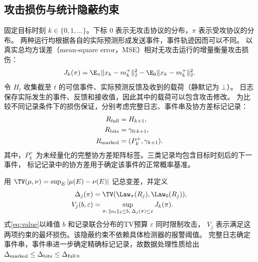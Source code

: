 \subsection{攻击损伤与统计隐蔽约束}
固定目标时刻 $k\in\{0,1,\ldots\}$。下标 $0$ 表示无攻击协议的分布，$\pi$ 表示受攻协议的分布。
两种运行均根据各自的实际预测形成发送事件，事件轨迹因而可以不同。
以真实总均方误差（mean-square error，MSE）相对无攻击运行的增量衡量攻击损伤：
\begin{equation}
 J_k(\pi)=\E_\pi\|x_k-m_k^+\|_2^2-
             \E_0\|x_k-m_k^+\|_2^2.
 \label{eq:damage}
\end{equation}
令 $H_t$ 收集截至 $t$ 的可信事件、实际预测反馈及收到的载荷（静默记为 $\bot$）。
日志保存实际发生的事件、反馈和接收值，因此其中的载荷可以包含攻击修改。
为比较不同记录条件下的损伤保证，分别考虑完整日志、事件串及协方差标记记录：
\begin{equation}
 \begin{aligned}
 R_{\rm full}&=H_{k+1},\\
 R_{\rm bits}&=\gamma_{0:k+1},\\
 R_{\rm marked}&=(P_k^+,\gamma_{k+1}).
 \end{aligned}
 \label{eq:records}
\end{equation}
其中，$P_k^+$ 为未经量化的完整协方差矩阵标签。三类记录均包含目标时刻后的下一事件，
标记记录中的协方差用于确定该事件的正常概率基准。

用 $\TV(\mu,\nu)=\sup_E|\mu(E)-\nu(E)|$ 记总变差，并定义
\begin{equation}
 \begin{aligned}
 \Delta_j(\pi)&=\TV(\Law_\pi(R_j),\Law_0(R_j)),\\
 V_j(b,\varepsilon)&=\sup_{\pi:\,\|a_t\|_2\le b,\,\Delta_j(\pi)\le\varepsilon}J_k(\pi).
 \end{aligned}
 \label{eq:value}
\end{equation}
式\eqref{eq:value}以峰值 $b$ 和记录联合分布的TV预算 $\varepsilon$ 同时限制攻击，
$V_j$ 表示满足这两项约束的最坏损伤。该隐蔽约束不依赖具体检测器的报警阈值。
完整日志确定事件串，事件串进一步确定精确标记记录，故数据处理性质给出
$\Delta_{\rm marked}\le\Delta_{\rm bits}\le\Delta_{\rm full}$。

